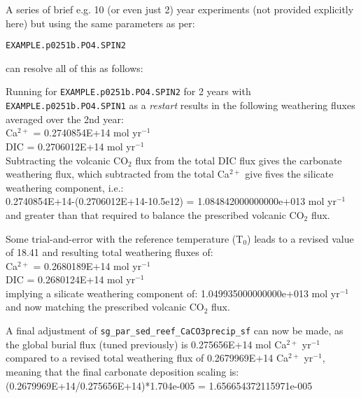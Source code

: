 \documentclass[10pt,twoside]{article}
\begin{document}
A series of brief e.g. 10 (or even just 2) year experiments (not provided explicitly here) but using the same parameters as per:
\vspace{-5pt}\begin{verbatim}
EXAMPLE.p0251b.PO4.SPIN2
\end{verbatim}\vspace{-5pt}
can resolve all of this as follows:

        \begin{compactenum}
        
                \item Running for \texttt{EXAMPLE.p0251b.PO4.SPIN2} for 2 years with \texttt{EXAMPLE.p0251b.PO4.SPIN1} as a \textit{restart} results in the following weathering fluxes averaged over the 2nd year:
                \\Ca$^{2+}$ = 0.2740854E+14 mol yr$^{-1}$
                \\DIC = 0.2706012E+14 mol yr$^{-1}$
                \\Subtracting the volcanic CO$_{2}$ flux from the total DIC flux gives the carbonate weathering flux, which subtracted from the total Ca$^{2+}$ give fives the silicate weathering component, i.e.:
                \\0.2740854E+14-(0.2706012E+14-10.5e12) = 1.084842000000000e+013 mol yr$^{-1}$ and greater than that required to balance the prescribed volcanic CO$_{2}$ flux.
                
                \item Some trial-and-error with the reference temperature (T$_{0}$) leads to a revised value of 18.41 and resulting total weathering fluxes of:
                \\Ca$^{2+}$ = 0.2680189E+14 mol yr$^{-1}$
                \\DIC = 0.2680124E+14 mol yr$^{-1}$
                \\implying a silicate weathering component of: 1.049935000000000e+013 mol yr$^{-1}$ and now matching the prescribed volcanic CO$_{2}$ flux.
                
                \item A final adjustment of \texttt{sg\_par\_sed\_reef\_CaCO3precip\_sf} can now be made, as the global burial flux (tuned previously) is 0.275656E+14 mol Ca$^{2+}$ yr$^{-1}$ compared to a revised total weathering flux of 0.2679969E+14 Ca$^{2+}$ yr$^{-1}$, meaning that the final carbonate deposition scaling is:
                \\ (0.2679969E+14/0.275656E+14)*1.704e-005 = 1.656654372115971e-005
                
        \end{compactenum}
\end{document}
